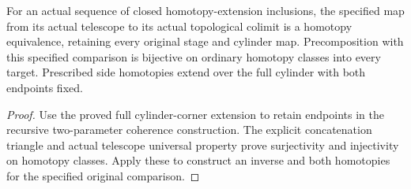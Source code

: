\begin{proposition}
  \label{prop:actual-topological-telescope-colimit-equivalence}
  \leanok
  For an actual sequence of closed homotopy-extension inclusions, the specified map from its actual telescope to its actual topological colimit is a homotopy equivalence, retaining every original stage and cylinder map. Precomposition with this specified comparison is bijective on ordinary homotopy classes into every target. Prescribed side homotopies extend over the full cylinder with both endpoints fixed.
\end{proposition}
\begin{proof}
  Use the proved full cylinder-corner extension to retain endpoints in the recursive two-parameter coherence construction. The explicit concatenation triangle and actual telescope universal property prove surjectivity and injectivity on homotopy classes. Apply these to construct an inverse and both homotopies for the specified original comparison.
  \leanok
\end{proof}

